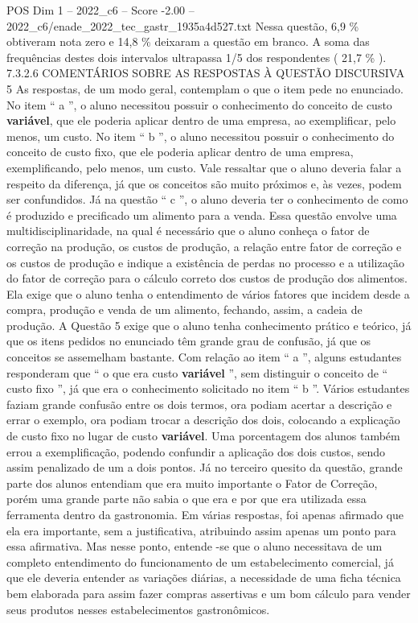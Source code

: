\begin{textsample}{POS Dim 1 – 2022\_c6 – Score -2.00 – 2022\_c6/enade\_2022\_tec\_gastr\_1935a4d527.txt}
Nessa questão, 6,9 \% obtiveram nota zero e 14,8 \% deixaram a questão em branco.
A soma das frequências destes dois intervalos ultrapassa 1/5 dos respondentes ( 21,7 \% ). 7.3.2.6 COMENTÁRIOS SOBRE AS RESPOSTAS À QUESTÃO DISCURSIVA 5 As respostas, de um modo geral, contemplam o que o item pede no enunciado.
No item “ a ”, o aluno necessitou possuir o conhecimento do conceito de custo \textbf{variável}, que ele poderia aplicar dentro de uma empresa, ao exemplificar, pelo menos, um custo.
No item “ b ”, o aluno necessitou possuir o conhecimento do conceito de custo fixo, que ele poderia aplicar dentro de uma empresa, exemplificando, pelo menos, um custo.
Vale ressaltar que o aluno deveria falar a respeito da diferença, já que os conceitos são muito próximos e, às vezes, podem ser confundidos.
Já na questão “ c ”, o aluno deveria ter o conhecimento de como é produzido e precificado um alimento para a venda.
Essa questão envolve uma multidisciplinaridade, na qual é necessário que o aluno conheça o fator de correção na produção, os custos de produção, a relação entre fator de correção e os custos de produção e indique a existência de perdas no processo e a utilização do fator de correção para o cálculo correto dos custos de produção dos alimentos.
Ela exige que o aluno tenha o entendimento de vários fatores que incidem desde a compra, produção e venda de um alimento, fechando, assim, a cadeia de produção.
A Questão 5 exige que o aluno tenha conhecimento prático e teórico, já que os itens pedidos no enunciado têm grande grau de confusão, já que os conceitos se assemelham bastante.
Com relação ao item “ a ”, alguns estudantes responderam que “ o que era custo \textbf{variável} ”, sem distinguir o conceito de “ custo fixo ”, já que era o conhecimento solicitado no item “ b ”.
Vários estudantes faziam grande confusão entre os dois termos, ora podiam acertar a descrição e errar o exemplo, ora podiam trocar a descrição dos dois, colocando a explicação de custo fixo no lugar de custo \textbf{variável}.
Uma porcentagem dos alunos também errou a exemplificação, podendo confundir a aplicação dos dois custos, sendo assim penalizado de um a dois pontos.
Já no terceiro quesito da questão, grande parte dos alunos entendiam que era muito importante o Fator de Correção, porém uma grande parte não sabia o que era e por que era utilizada essa ferramenta dentro da gastronomia.
Em várias respostas, foi apenas afirmado que ela era importante, sem a justificativa, atribuindo assim apenas um ponto para essa afirmativa.
Mas nesse ponto, entende -se que o aluno necessitava de um completo entendimento do funcionamento de um estabelecimento comercial, já que ele deveria entender as variações diárias, a necessidade de uma ficha técnica bem elaborada para assim fazer compras assertivas e um bom cálculo para vender seus produtos nesses estabelecimentos gastronômicos.

\end{textsample}
